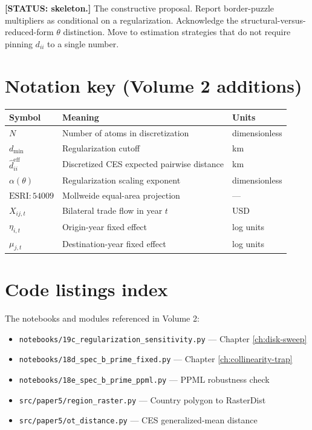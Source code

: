 \documentclass[11pt,letterpaper,oneside]{book}
\theoremstyle{definition}
\theoremstyle{remark}
\newcommand{\eff}{\mathrm{eff}}
\begin{document}
\textbf{[STATUS: skeleton.]} The constructive proposal. Report
border-puzzle multipliers as conditional on a regularization. Acknowledge
the structural-versus-reduced-form $\theta$ distinction. Move to
estimation strategies that do not require pinning $d_{ii}$ to a single
number.

\appendix
\chapter{Notation key (Volume 2 additions)}

\begin{small}
\begin{tabular}{l l l}
\toprule
Symbol & Meaning & Units \\
\midrule
$N$ & Number of atoms in discretization & dimensionless \\
$d_{\min}$ & Regularization cutoff & km \\
$\hat{d}_{ii}^{\eff}$ & Discretized CES expected pairwise distance & km \\
$\alpha(\theta)$ & Regularization scaling exponent & dimensionless \\
$\mathrm{ESRI:54009}$ & Mollweide equal-area projection & --- \\
$X_{ij,t}$ & Bilateral trade flow in year $t$ & USD \\
$\eta_{i,t}$ & Origin-year fixed effect & log units \\
$\mu_{j,t}$ & Destination-year fixed effect & log units \\
\bottomrule
\end{tabular}
\end{small}

\chapter{Code listings index}

The notebooks and modules referenced in Volume 2:
\begin{itemize}
  \item \texttt{notebooks/19c\_regularization\_sensitivity.py} — Chapter \ref{ch:disk-sweep}
  \item \texttt{notebooks/18d\_spec\_b\_prime\_fixed.py} — Chapter \ref{ch:collinearity-trap}
  \item \texttt{notebooks/18e\_spec\_b\_prime\_ppml.py} — PPML robustness check
  \item \texttt{src/paper5/region\_raster.py} — Country polygon to RasterDist
  \item \texttt{src/paper5/ot\_distance.py} — CES generalized-mean distance
\end{itemize}
\end{document}
